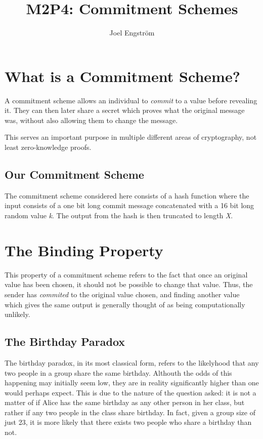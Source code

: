 \documentclass[a4paper,11pt]{article}
\title{M2P4: Commitment Schemes}
\author{Joel Engström}
\begin{document}
\maketitle

\section{What is a Commitment Scheme?}
A commitment scheme allows an individual to \textit{commit} to a value before revealing it. They can then later share a secret which proves what the original message was, without also allowing them to change the message.

This serves an important purpose in multiple different areas of cryptography, not least zero-knowledge proofs.

\subsection{Our Commitment Scheme}

The commitment scheme considered here consists of a hash function where the input consists of a one bit long commit message concatenated with a 16 bit long random value \textit{k}. The output from the hash is then truncated to length \textit{X}.

\section{The Binding Property}
This property of a commitment scheme refers to the fact that once an original value has been chosen, it should not be possible to change that value. Thus, the sender has \textit{commited} to the original value chosen, and finding another value which gives the same output is generally thought of as being computationally unlikely.

\subsection{The Birthday Paradox}
The birthday paradox, in its most classical form, refers to the likelyhood that any two people in a group share the same birthday. Althouth the odds of this happening may initially seem low, they are in reality significantly higher than one would perhaps expect. This is due to the nature of the question asked: it is not a matter of if Alice has the same birthday as any other person in her class, but rather if any two people in the class share birthday. In fact, given a group size of just 23, it is more likely that there exists two people who share a birthday than not.
\end{document}
